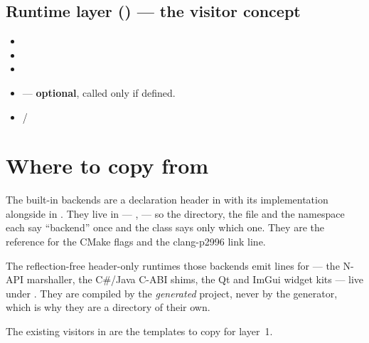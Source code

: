 \subsection*{Runtime layer () --- the visitor concept}

\begin{itemize}
  \item {}
  \item {}
  \item {}
  \item {} ---
    \textbf{optional}, called only if defined.
  \item {} /
\end{itemize}

\section{Where to copy from}

The built-in backends are a declaration header in
 with its implementation alongside in
. They live in 
--- ,  --- so the directory, the file
and the namespace each say ``backend'' once and the class says only which one.
They are the reference for the CMake flags and the clang-p2996 link line.

The reflection-free header-only runtimes those backends emit 
lines for --- the N-API marshaller, the C\#/Java C-ABI shims, the Qt and ImGui
widget kits --- live under . They are compiled by
the \emph{generated} project, never by the generator, which is why they are a
directory of their own.

The existing visitors in  are the templates to
copy for layer~1.
